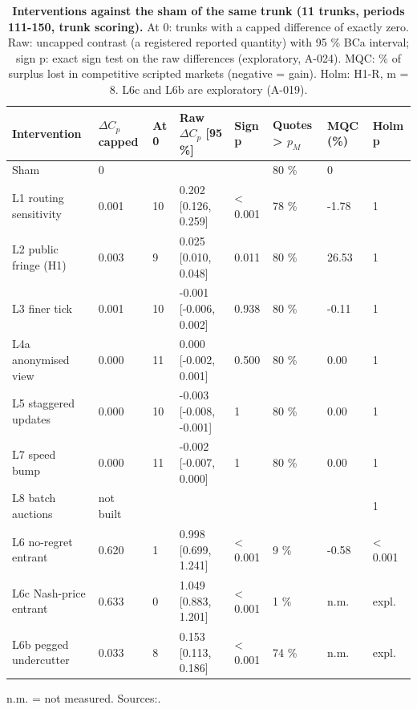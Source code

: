 \documentclass[11pt,a4paper]{article}
\newif\ifclaimtags
\newcommand{\claim}[1]{\ifclaimtags\textsuperscript{[#1]}\fi}
\begin{document}
\begin{landscape}
\begin{table}[htbp]
\centering
\renewcommand{\thetable}{2}
\caption{\scriptsize \textbf{Interventions against the sham of the same trunk (11 trunks, periods 111-150, trunk scoring).} At 0: trunks with a capped difference of exactly zero. Raw: uncapped contrast (a registered reported quantity) with 95 \% BCa interval; sign p: exact sign test on the raw differences (exploratory, A-024). MQC: \% of surplus lost in competitive scripted markets (negative = gain). Holm: H1-R, m = 8. L6c and L6b are exploratory (A-019).}
\label{tab:2}
\scriptsize
\setlength{\tabcolsep}{2pt}
\renewcommand{\arraystretch}{0.85}
\begin{tabularx}{\linewidth}{@{}LLLLLLLL@{}}
\toprule
Intervention & $\Delta C_p$ capped & At 0 & Raw $\Delta C_p$ [95 \%] & Sign p & Quotes > $p_M$ & MQC (\%) & Holm p \\
\midrule
Sham & 0 &  &  &  & 80 \% & 0 &  \\
L1 routing sensitivity & 0.001 & 10 & 0.202 [0.126, 0.259] & < 0.001 & 78 \% & -1.78 & 1 \\
L2 public fringe (H1) & 0.003 & 9 & 0.025 [0.010, 0.048] & 0.011 & 80 \% & 26.53 & 1 \\
L3 finer tick & 0.001 & 10 & -0.001 [-0.006, 0.002] & 0.938 & 80 \% & -0.11 & 1 \\
L4a anonymised view & 0.000 & 11 & 0.000 [-0.002, 0.001] & 0.500 & 80 \% & 0.00 & 1 \\
L5 staggered updates & 0.000 & 10 & -0.003 [-0.008, -0.001] & 1 & 80 \% & 0.00 & 1 \\
L7 speed bump & 0.000 & 11 & -0.002 [-0.007, 0.000] & 1 & 80 \% & 0.00 & 1 \\
L8 batch auctions & not built &  &  &  &  &  & 1 \\
L6 no-regret entrant & 0.620 & 1 & 0.998 [0.699, 1.241] & < 0.001 & 9 \% & -0.58 & < 0.001 \\
L6c Nash-price entrant & 0.633 & 0 & 1.049 [0.883, 1.201] & < 0.001 & 1 \% & n.m. & expl. \\
L6b pegged undercutter & 0.033 & 8 & 0.153 [0.113, 0.186] & < 0.001 & 74 \% & n.m. & expl. \\
\bottomrule
\end{tabularx}
\end{table}
\end{landscape}

n.m. = not measured. Sources:\claim{C3a}\claim{C3c}\claim{C11}\claim{C13}.
\end{document}
